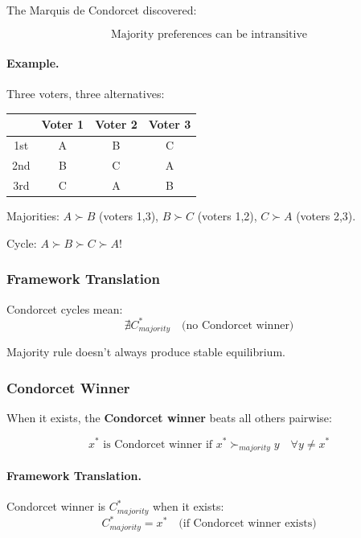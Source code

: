 The Marquis de Condorcet discovered:

\begin{equation}
\boxed{
\text{Majority preferences can be intransitive}
}
\label{eq:condorcet}
\end{equation}

\paragraph{Example.}
Three voters, three alternatives:
\begin{center}
\begin{tabular}{|c|c|c|c|}
\hline
& Voter 1 & Voter 2 & Voter 3 \\
\hline
1st & A & B & C \\
2nd & B & C & A \\
3rd & C & A & B \\
\hline
\end{tabular}
\end{center}

Majorities: $A \succ B$ (voters 1,3), $B \succ C$ (voters 1,2), $C \succ A$ (voters 2,3).

Cycle: $A \succ B \succ C \succ A$!

\subsubsection{Framework Translation}

Condorcet cycles mean:
\begin{equation}
\nexists C^*_{majority} \quad \text{(no Condorcet winner)}
\end{equation}

Majority rule doesn't always produce stable equilibrium.

\subsubsection{Condorcet Winner}

When it exists, the \textbf{Condorcet winner} beats all others pairwise:

\begin{equation}
x^* \text{ is Condorcet winner if } x^* \succ_{majority} y \quad \forall y \neq x^*
\end{equation}

\paragraph{Framework Translation.}
Condorcet winner is $C^*_{majority}$ when it exists:
\begin{equation}
C^*_{majority} = x^* \quad \text{(if Condorcet winner exists)}
\end{equation}

